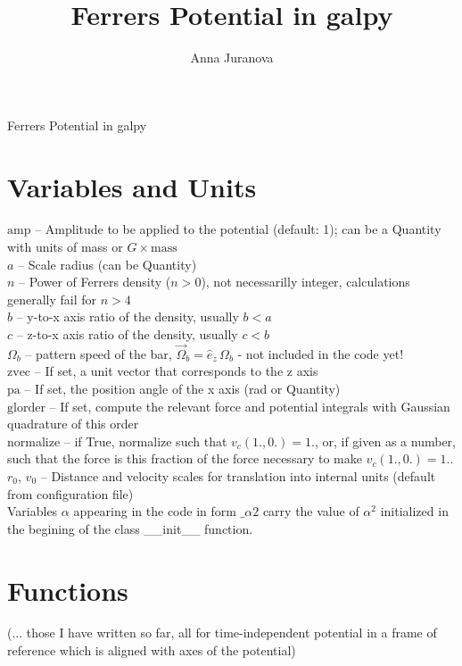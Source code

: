 \documentclass[a4paper,11pt]{article}
\author{Anna Juranova}
\title{Ferrers Potential in galpy}
\begin{document}
	
	\begin{center}
		\huge{Ferrers Potential in galpy}\\
	\end{center}

	\section{Variables and Units}
           $ \mathrm{amp} $ -- Amplitude to be applied to the potential (default: 1); can be a Quantity with units of mass or $ G \times \mathrm{mass} $\\
           $ a $ -- Scale radius (can be Quantity)\\
           $ n $ -- Power of Ferrers density ($ n > 0 $), not necessarilly integer, calculations generally fail for $ n > 4 $\\
           $ b $ -- y-to-x axis ratio of the density, usually $ b < a $\\
           $ c $ -- z-to-x axis ratio of the density, usually $ c < b $\\
           $ \Omega_b $ -- pattern speed of the bar, $ \vec{\Omega}_b = \hat{e}_z\,\Omega_b $ - not included in the code yet!\\
           $ \mathrm{zvec} $ -- If set, a unit vector that corresponds to the z axis\\
           $ \mathrm{pa} $ -- If set, the position angle of the x axis (rad or Quantity)\\
           $ \mathrm{glorder} $ -- If set, compute the relevant force and potential integrals with Gaussian quadrature of this order\\
           normalize -- if True, normalize such that $ v_c(1.,0.)=1. $, or, if given as a number, such that the force is this fraction of the force necessary to make $ v_c(1.,0.)=1. $.\\
           $ r_0 $, $ v_0 $ -- Distance and velocity scales for translation into internal units (default from configuration file)\\
           Variables $ \alpha $	appearing in the code in form $ \_\alpha2 $ carry the value of $ \alpha^2 $ initialized in the begining of the class \_\_init\_\_ function.

	\section{Functions}
	(... those I have written so far, all for time-independent potential in a frame of reference which is aligned with axes of the potential)
		 
\end{document}
